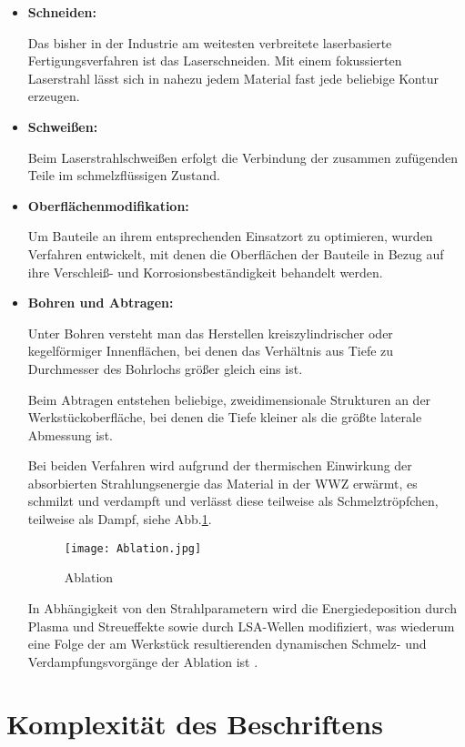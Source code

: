 \documentclass{article}
\begin{document}
\begin{itemize}
\item \textbf{Schneiden:}

Das bisher in der Industrie am weitesten verbreitete laserbasierte Fertigungsverfahren ist das Laserschneiden.
Mit einem fokussierten Laserstrahl lässt sich in nahezu jedem Material fast jede beliebige Kontur erzeugen.

\item \textbf{Schweißen:}

Beim Laserstrahlschweißen erfolgt die Verbindung der zusammen zufü\-gen\-den Teile im schmelzflüssigen Zustand.

\item \textbf{Oberflächenmodifikation:}

Um Bauteile an ihrem entsprechenden Einsatzort zu optimieren, wurden Verfahren entwickelt, mit denen die Oberflächen der Bauteile in Bezug auf ihre Verschleiß- und Korrosionsbeständigkeit behandelt werden.

\item \textbf{Bohren und Abtragen:}

Unter Bohren versteht man das Herstellen kreiszylindrischer oder ke\-gel\-för\-miger Innenflächen, bei denen das Verhältnis aus Tiefe zu Durchmesser des Bohrlochs größer gleich eins ist.

Beim Abtragen entstehen beliebige, zweidimensionale Strukturen an der Werk\-stück\-oberfläche, bei denen die Tiefe kleiner als die größte laterale Abmessung ist.

Bei beiden Verfahren wird aufgrund der thermischen Einwirkung der absorbierten Strahlungsenergie das Material in der WWZ erwärmt, es schmil\-zt und verdampft und verlässt diese teilweise als Schmelztröpfchen, teilweise als Dampf, siehe Abb.\ref{Ablation}.
\begin{figure}[ht]
	\centering
	\texttt{[image: Ablation.jpg]}
	\caption{Ablation \cite{HueGra}}
	\label{Ablation}
\end{figure}

In Abhängigkeit von den Strahlparametern wird die Energiedepo\-si\-tion durch Plasma und Streueffekte sowie durch LSA-Wellen modifiziert, was wiederum eine Folge der am Werkstück resultierenden dynamischen Schmel\-z- und Verdampfungsvorgänge der Ablation ist \cite{Eichler,Steen,HueGra}.
\end{itemize}


\section{Komplexität des Beschriftens}\label{beschriften}
\end{document}
